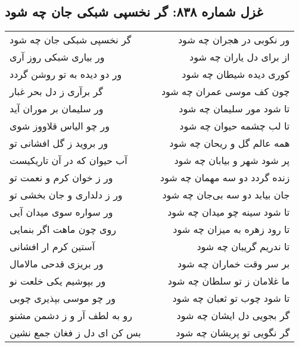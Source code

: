 \begin{center}
\section*{غزل شماره ۸۳۸: گر نخسپی شبکی جان چه شود}
\label{sec:0838}
\begin{longtable}{l p{0.5cm} r}
گر نخسپی شبکی جان چه شود
&&
ور نکوبی در هجران چه شود
\\
ور بیاری شبکی روز آری
&&
از برای دل یاران چه شود
\\
ور دو دیده به تو روشن گردد
&&
کوری دیده شیطان چه شود
\\
گر برآری ز دل بحر غبار
&&
چون کف موسی عمران چه شود
\\
ور سلیمان بر موران آید
&&
تا شود مور سلیمان چه شود
\\
ور چو الیاس قلاووز شوی
&&
تا لب چشمه حیوان چه شود
\\
ور بروید ز گل افشانی تو
&&
همه عالم گل و ریحان چه شود
\\
آب حیوان که در آن تاریکیست
&&
پر شود شهر و بیابان چه شود
\\
ور ز خوان کرم و نعمت تو
&&
زنده گردد دو سه مهمان چه شود
\\
ور ز دلداری و جان بخشی تو
&&
جان بیابد دو سه بی‌جان چه شود
\\
ور سواره سوی میدان آیی
&&
تا شود سینه چو میدان چه شود
\\
روی چون ماهت اگر بنمایی
&&
تا رود زهره به میزان چه شود
\\
آستین کرم ار افشانی
&&
تا ندریم گریبان چه شود
\\
ور بریزی قدحی مالامال
&&
بر سر وقت خماران چه شود
\\
ور بپوشیم یکی خلعت نو
&&
ما غلامان ز تو سلطان چه شود
\\
ور چو موسی بپذیری چوبی
&&
تا شود چوب تو ثعبان چه شود
\\
رو به لطف آر و ز دشمن مشنو
&&
گر بجویی دل ایشان چه شود
\\
بس کن ای دل ز فغان جمع نشین
&&
گر نگویی تو پریشان چه شود
\\
\end{longtable}
\end{center}
